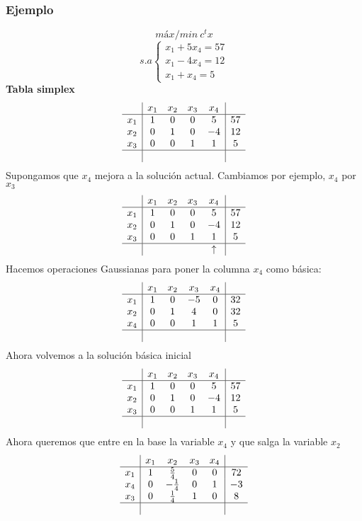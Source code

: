 \documentclass[11pt,fleqn]{book} %
\begin{document}
\subsubsection{Ejemplo}
$$ máx/min ~c^t x$$
$$s.a \left\{ \begin{array}{c}
x_1+5x_4=57 \\
x_1-4 x_4=12 \\
x_1+x_4 = 5
\end{array}\right.$$
\textbf{Tabla simplex}
$$
\begin{array}{c|cccc|c}
 & x_1 & x_2 & x_3 & x_4 &  \\ \hline
x_1 & 1 & 0 & 0 & 5 & 57 \\
x_2 & 0 & 1 & 0 & -4 & 12 \\
x_3 & 0 & 0 & 1 & 1 & 5 \\ \hline
& & & & &
\end{array}
$$
Supongamos que $x_4$ mejora a la solución actual. Cambiamos por ejemplo, $x_4$ por $x_3$
$$
\begin{array}{c|cccc|c}
& x_1 & x_2 & x_3 & x_4 &  \\ \hline
x_1 & 1 & 0 & 0 & 5 & 57 \\
x_2 & 0 & 1 & 0 & -4 & 12 \\
x_3 & 0 & 0 & 1 & 1 & 5 \\ \hline
& & & & \uparrow &
\end{array}
$$
Hacemos operaciones Gaussianas para poner la columna $x_4$ como básica:
$$
\begin{array}{c|cccc|c}
& x_1 & x_2 & x_3 & x_4 &  \\ \hline
x_1 & 1 & 0 & -5 & 0 & 32 \\
x_2 & 0 & 1 & 4 & 0 & 32 \\
x_4 & 0 & 0 & 1 & 1 & 5 \\ \hline
& & & &  &
\end{array}
$$
Ahora volvemos a la solución básica inicial
$$
\begin{array}{c|cccc|c}
& x_1 & x_2 & x_3 & x_4 &  \\ \hline
x_1 & 1 & 0 & 0 & 5 & 57 \\
x_2 & 0 & 1 & 0 & -4 & 12 \\
x_3 & 0 & 0 & 1 & 1 & 5 \\ \hline
& & & & &
\end{array}
$$
Ahora queremos que entre en la base la variable $x_4$ y que salga la variable $x_2$
$$
\begin{array}{c|cccc|c}
& x_1 & x_2 & x_3 & x_4 &  \\ \hline
x_1 & 1 & \frac{5}{4} & 0 & 0 & 72 \\
x_4 & 0 & -\frac{1}{4} & 0 & 1 & -3 \\
x_3 & 0 & \frac{1}{4} & 1 & 0 & 8 \\ \hline
& & & & &
\end{array}
$$
\end{document}
